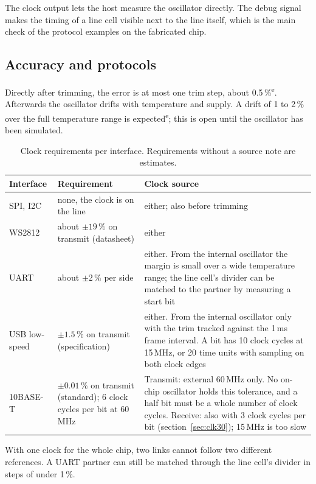 \documentclass[10pt,a4paper]{article}
\newcommand{\est}{\textsuperscript{e}}
\begin{document}
The clock output lets the host measure the oscillator directly. The debug signal makes the timing of a line
cell visible next to the line itself, which is the main check of the protocol examples on the fabricated chip.

\subsection{Accuracy and protocols}

Directly after trimming, the error is at most one trim step, about 0.5\,\%\est. Afterwards the oscillator
drifts with temperature and supply. A drift of 1 to 2\,\% over the full temperature range is expected\est; this
is open until the oscillator has been simulated.

\begin{table}[H]
\centering\small
\begin{tabularx}{\linewidth}{@{}llL@{}}
\toprule
Interface & Requirement & Clock source \\
\midrule
SPI, I2C & none, the clock is on the line & either; also before trimming \\
WS2812 & about $\pm 19\,\%$ on transmit (datasheet) & either \\
UART & about $\pm 2\,\%$ per side & either. From the internal oscillator the margin is small over a wide temperature range; the line cell's divider can be matched to the partner by measuring a start bit \\
USB low-speed & $\pm 1.5\,\%$ on transmit (specification) & either. From the internal oscillator only with the trim tracked against the 1\,ms frame interval. A bit has 10 clock cycles at 15\,MHz, or 20 time units with sampling on both clock edges \\
10BASE-T & $\pm 0.01\,\%$ on transmit (standard); 6 clock cycles per bit at 60\,MHz & Transmit: external 60\,MHz only. No on-chip oscillator holds this tolerance, and a half bit must be a whole number of clock cycles. Receive: also with 3 clock cycles per bit (section~\ref{sec:clk30}); 15\,MHz is too slow \\
\bottomrule
\end{tabularx}
\caption{Clock requirements per interface. Requirements without a source note are estimates.}
\end{table}

With one clock for the whole chip, two links cannot follow two different references. A UART partner can still
be matched through the line cell's divider in steps of under 1\,\%.
\end{document}
